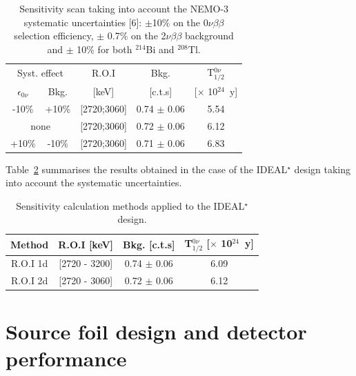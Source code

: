 \documentclass[main.tex]{subfiles}
\begin{document}
\begin{table}[h!]
\centering
\begin{tabular}{c|c|c|c|c}
\multicolumn{2}{c|}{Syst. effect} & R.O.I & Bkg. & T$_{\text{1/2}}^{\text{0}\nu}$ \\
$\epsilon_{\text{0}\nu}$ & Bkg. & [keV] & [c.t.s] & [$\times$ 10$^{\text{24}}$~y] \\[0.1cm]
\toprule
-10\%                    & +10\% & [2720;3060] & 0.74 $\pm$ 0.06 & 5.54 \\[0.1cm]
\hline
\multicolumn{2}{c|}{none}   & [2720;3060] & 0.72 $\pm$ 0.06 & 6.12 \\[0.1cm]
\hline
+10\%                    & -10\% &[2720;3060] & 0.71 $\pm$ 0.06 & 6.83 \\[0.1cm]
\bottomrule
\end{tabular}
\caption{Sensitivity scan taking into account the NEMO-3 systematic uncertainties [6]: $\pm$10\% on the 0$\nu\beta\beta$ selection efficiency, $\pm$ 0.7\% on the 2$\nu\beta\beta$ background and $\pm$ 10\% for both $^{\text{214}}$Bi and $^{\text{208}}$Tl.}
\label{Tab:SystUncertaintiesSourceFoil}
\end{table}


\bigskip


\NI Table~\ref{Tab:SensCalculationIDEAL} summarises the results obtained in the case of the IDEAL$^\star$ design taking into account the systematic uncertainties.


\bigskip

\bigskip

\begin{table}[h!]
\centering
\begin{tabular}{c|c|c|c}
\toprule
Method & R.O.I [keV] & Bkg. [c.t.s] & T$_{\text{1/2}}^{\text{0}\nu}$ [$\times$ 10$^{\text{24}}$~y] \\[0.1cm]
\hline
R.O.I 1d & [2720 - 3200] & 0.74 $\pm$ 0.06 & 6.09 \\ [0.1cm]
R.O.I 2d & [2720 - 3060] & 0.72 $\pm$ 0.06 & 6.12 \\ [0.1cm]
\bottomrule
\end{tabular}
\caption{Sensitivity calculation methods applied to the IDEAL$^{\star}$ design.}
\label{Tab:SensCalculationIDEAL}
\end{table}


\section{Source foil design and detector performance}\label{sec:SourceFoilDesignDetectorPerformance}
\end{document}
